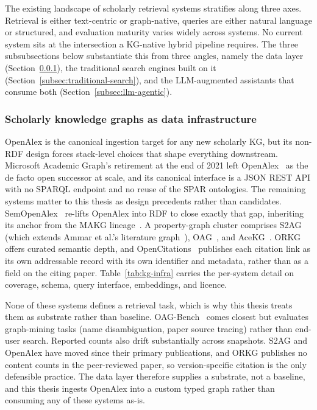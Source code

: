 The existing landscape of scholarly retrieval systems stratifies along three
axes. Retrieval is either text-centric or graph-native, queries are either
natural language or structured, and evaluation maturity varies widely across
systems. No current system sits at
the intersection a KG-native hybrid pipeline requires. The three subsubsections
below substantiate this from three angles, namely the data layer
(Section~\ref{subsec:kg-infrastructure}), the traditional search engines built
on it (Section~\ref{subsec:traditional-search}), and the LLM-augmented
assistants that consume both (Section~\ref{subsec:llm-agentic}).

\subsubsection{Scholarly knowledge graphs as data infrastructure}
\label{subsec:kg-infrastructure}

OpenAlex is the canonical ingestion target for any new scholarly KG, but its
non-RDF design forces stack-level choices that shape everything downstream.
Microsoft Academic Graph's retirement at the end of 2021 left
OpenAlex~\cite{priem2022openalex} as the de facto open successor at scale, and
its canonical interface is a JSON REST API with no SPARQL endpoint and no
reuse of the SPAR ontologies.  The remaining systems matter to this thesis as
design precedents rather than candidates.
SemOpenAlex~\cite{farber2023semopenalex} re-lifts OpenAlex into RDF to close
exactly that gap, inheriting its anchor from the MAKG
lineage~\cite{farber2019makg,farber2022makgenhanced}.  A property-graph
cluster comprises S2AG~\cite{kinney2023semanticscholar} (which extends Ammar
et al.'s literature graph~\cite{ammar2018construction}),
OAG~\cite{zhang2019oag,zhang2024oagbench}, and AceKG~\cite{wang2018acekg}.
ORKG~\cite{jaradeh2019orkg} offers curated semantic depth, and
OpenCitations~\cite{peroni2020opencitations,heibi2019coci,massari2024ocmeta,heibi2024ocindex}
publishes each citation link as its own addressable record with its
own identifier and metadata, rather than as a field on the citing
paper.  Table~\ref{tab:kg-infra} carries
the per-system detail on coverage, schema, query interface, embeddings, and
licence.

None of these systems defines a retrieval task, which is why this thesis
treats them as substrate rather than baseline.
OAG-Bench~\cite{zhang2024oagbench} comes closest but evaluates graph-mining
tasks (name disambiguation, paper source tracing) rather than end-user search.
Reported counts also drift substantially across snapshots. S2AG and OpenAlex
have moved since their primary publications, and ORKG publishes no content
counts in the peer-reviewed paper, so version-specific citation is the only
defensible practice. The data layer therefore supplies a substrate, not a
baseline, and this thesis ingests OpenAlex into a custom typed graph rather
than consuming any of these systems as-is.

